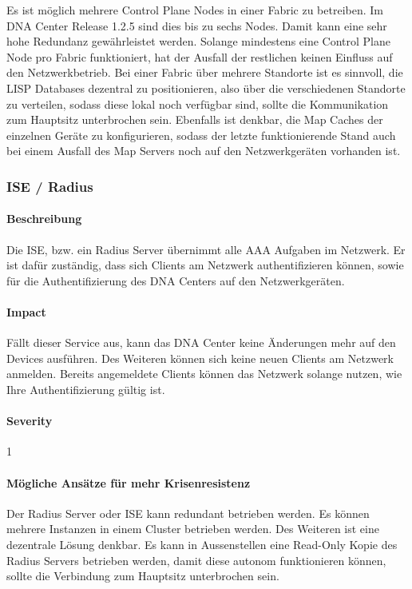 Es ist möglich mehrere Control Plane Nodes in einer Fabric zu betreiben. Im DNA Center Release 1.2.5 sind dies bis zu sechs Nodes. Damit kann eine sehr hohe Redundanz gewährleistet werden. Solange mindestens eine Control Plane Node pro Fabric funktioniert, hat der Ausfall der restlichen keinen Einfluss auf den Netzwerkbetrieb. Bei einer Fabric über mehrere Standorte ist es sinnvoll, die LISP Databases dezentral zu positionieren, also über die verschiedenen Standorte zu verteilen, sodass diese lokal noch verfügbar sind, sollte die Kommunikation zum Hauptsitz unterbrochen sein. Ebenfalls ist denkbar, die Map Caches der einzelnen Geräte zu konfigurieren, sodass der letzte funktionierende Stand auch bei einem Ausfall des Map Servers noch auf den Netzwerkgeräten vorhanden ist. 


\subsubsection{ISE / Radius}

\paragraph{Beschreibung}

Die ISE, bzw. ein Radius Server übernimmt alle AAA Aufgaben im Netzwerk. Er ist dafür zuständig, dass sich Clients am Netzwerk authentifizieren können, sowie für die Authentifizierung des DNA Centers auf den Netzwerkgeräten.

\paragraph{Impact}

Fällt dieser Service aus, kann das DNA Center keine Änderungen mehr auf den Devices ausführen. Des Weiteren können sich keine neuen Clients am Netzwerk anmelden. Bereits angemeldete Clients können das Netzwerk solange nutzen, wie Ihre Authentifizierung gültig ist.

\paragraph{Severity} 1

\paragraph{Mögliche Ansätze für mehr Krisenresistenz}

Der Radius Server oder ISE kann redundant betrieben werden. Es können mehrere Instanzen in einem Cluster betrieben werden. Des Weiteren ist eine dezentrale Lösung denkbar. Es kann in Aussenstellen eine Read-Only Kopie des Radius Servers betrieben werden, damit diese autonom funktionieren können, sollte die Verbindung zum Hauptsitz unterbrochen sein.

